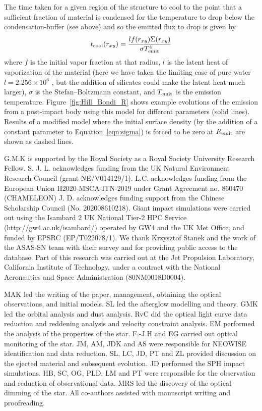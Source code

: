 \documentclass[sn-nature,oneside]{sn-jnl}%
\begin{document}
%
The time taken for a given region of the structure to cool to the point that a sufficient fraction of material is condensed for the temperature to drop below the condensation-buffer (see above) and so the emitted flux to drop is given by
%
\begin{equation}
    t_{\rm cool} (r_{xy})=\frac{l f(r_{xy}) \Sigma(r_{xy})}{\sigma T^4_{\rm emit}}
\end{equation}
%
where $f$ is the initial vapor fraction at that radius, $l$ is the latent heat of vaporization of the material (here we have taken the limiting case of pure water $l=2.256\times 10^6$ \cite{Chase1998}, but the addition of silicates could make the latent heat much larger), $\sigma$ is the Stefan–Boltzmann constant, and $T_{\rm emit}$ is the emission temperature.
%
Figure~\ref{fig:Hill_Bondi_R} shows example evolutions of the emission from a post-impact body using this model for different parameters (solid lines).
%
Results of a modified model where the initial surface density (by the addition of a constant parameter to Equation~\ref{eqn:sigma}) is forced to be zero at $R_{\rm emit}$ are shown as dashed lines.


G.M.K is supported by the Royal Society as a Royal Society University Research Fellow.
%
S. J. L. acknowledges funding from the UK Natural Environment Research Council (grant NE/V014129/1).
%
L.C. acknowledges funding from the European Union H2020-MSCA-ITN-2019 under Grant Agreement no. 860470 (CHAMELEON)
%
J. D. acknowledges funding support from the Chinese Scholarship Council (No. 202008610218).
%
Giant impact simulations were carried out using the Isambard 2 UK National Tier-2 HPC Service (http://gw4.ac.uk/isambard/) operated by GW4 and the UK Met Office, and funded by EPSRC (EP/T022078/1).
%
We thank Krzysztof Stanek and the work of the ASAS-SN team with their survey and for providing public access to the database.
%
Part of this research was carried out at the Jet Propulsion Laboratory, California Institute of Technology, under a contract with the National Aeronautics and Space Administration (80NM0018D0004).

MAK led the writing of the paper, management, obtaining the optical observations, and initial models.
%
SL led the afterglow modelling and theory.
%
GMK led the orbital analysis and dust analysis.
%
RvC did the optical light curve data reduction and reddening analysis and velocity constraint analysis.
%
EM performed the analysis of the properties of the star.
%
F.-J.H and EG carried out optical monitoring of the star.
%
JM, AM, JDK and AS were responsible for NEOWISE identification and data reduction.
%
SL, LC, JD, PT and ZL provided discussion on the ejected material and subsequent evolution.
%
JD performed the SPH impact simulations.
%
HB, SC, OG, PLD, LM and PT were responsible for the observation and reduction of observational data.
%
MRS led the discovery of the optical dimming of the star.
%
All co-authors assisted with manuscript writing and proofreading.
\end{document}
